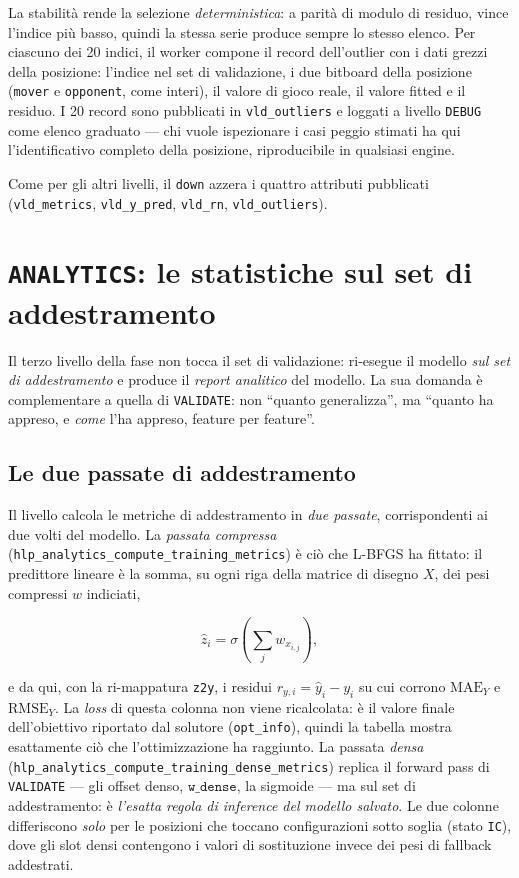 La stabilità rende la selezione \emph{deterministica}: a parità di modulo di
residuo, vince l'indice più basso, quindi la stessa serie produce sempre
lo stesso elenco. Per ciascuno dei 20 indici, il worker compone il record
dell'outlier con i dati grezzi della posizione: l'indice nel set di
validazione, i due bitboard della posizione (\texttt{mover} e
\texttt{opponent}, come interi), il valore di gioco reale, il valore fitted e
il residuo. I 20 record sono pubblicati in \texttt{vld\_outliers} e loggati
a livello \texttt{DEBUG} come elenco graduato — chi vuole ispezionare i
casi peggio stimati ha qui l'identificativo completo della posizione,
riproducibile in qualsiasi engine.

Come per gli altri livelli, il \texttt{down} azzera i quattro attributi
pubblicati (\texttt{vld\_metrics}, \texttt{vld\_y\_pred}, \texttt{vld\_rn},
\texttt{vld\_outliers}).

\section{\texttt{ANALYTICS}: le statistiche sul set di addestramento}

Il terzo livello della fase non tocca il set di validazione: ri-esegue il
modello \emph{sul set di addestramento} e produce il \emph{report
analitico} del modello. La sua domanda è complementare a quella di
\texttt{VALIDATE}: non ``quanto generalizza'', ma ``quanto ha appreso, e
\emph{come} l'ha appreso, feature per feature''.

\subsection{Le due passate di addestramento}

Il livello calcola le metriche di addestramento in \emph{due passate},
corrispondenti ai due volti del modello. La \emph{passata compressa}
(\texttt{hlp\_analytics\_compute\_training\_metrics}) è ciò che L-BFGS ha
fittato: il predittore lineare è la somma, su ogni riga della matrice di
disegno $X$, dei pesi compressi $w$ indiciati,

\begin{equation}
  \hat{z}_i = \sigma\!\left( \sum_{j} w_{x_{i,j}} \right),
\end{equation}

e da qui, con la ri-mappatura \texttt{z2y}, i residui $r_{y,i} =
\hat{y}_i - y_i$ su cui corrono $\mathrm{MAE}_{Y}$ e $\mathrm{RMSE}_{Y}$.
La \emph{loss} di questa colonna non viene ricalcolata: è il valore finale
dell'obiettivo riportato dal solutore (\texttt{opt\_info}), quindi la
tabella mostra esattamente ciò che l'ottimizzazione ha raggiunto. La
passata \emph{densa}
(\texttt{hlp\_analytics\_compute\_training\_dense\_metrics}) replica il
forward pass di \texttt{VALIDATE} — gli offset denso, $\texttt{w\_dense}$,
la sigmoide — ma sul set di addestramento: è \emph{l'esatta regola di
inference del modello salvato}. Le due colonne differiscono \emph{solo} per
le posizioni che toccano configurazioni sotto soglia (stato \texttt{IC}),
dove gli slot densi contengono i valori di sostituzione invece dei pesi di
fallback addestrati.

